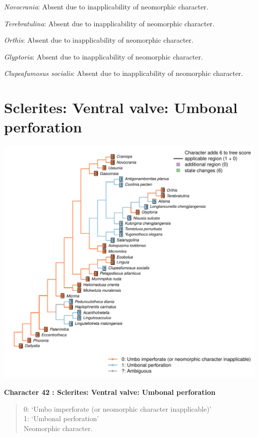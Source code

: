 \documentclass[]{book}
\theoremstyle{definition}
\theoremstyle{definition}
\theoremstyle{definition}
\theoremstyle{remark}
\begin{document}
\emph{Novocrania}: Absent due to inapplicability of neomorphic
character.

\emph{Terebratulina}: Absent due to inapplicability of neomorphic
character.

\emph{Orthis}: Absent due to inapplicability of neomorphic character.

\emph{Glyptoria}: Absent due to inapplicability of neomorphic character.

\emph{Clupeafumosus socialis}: Absent due to inapplicability of
neomorphic character.

\hypertarget{sclerites-ventral-valve-umbonal-perforation}{%
\section*{Sclerites: Ventral valve: Umbonal
perforation}\label{sclerites-ventral-valve-umbonal-perforation}}

\includegraphics{Brachiopod_phylogeny_files/figure-latex/unnamed-chunk-5-42.pdf}

\textbf{Character 42 : Sclerites: Ventral valve: Umbonal perforation }

\begin{quote}
0: `Umbo imperforate (or neomorphic character inapplicable)'\\
1: `Umbonal perforation'\\
Neomorphic character.
\end{quote}
\end{document}
